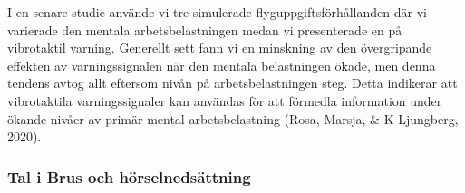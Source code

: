 \documentclass[]{article}
\begin{document}
I en senare studie använde vi tre simulerade flyguppgiftsförhållanden
där vi varierade den mentala arbetsbelastningen medan vi presenterade en
på vibrotaktil varning. Generellt sett fann vi en minskning av den
övergripande effekten av varningssignalen när den mentala belastningen
ökade, men denna tendens avtog allt eftersom nivån på arbetsbelastningen
steg. Detta indikerar att vibrotaktila varningssignaler kan användas för
att förmedla information under ökande nivåer av primär mental
arbetsbelastning (Rosa, Marsja, \& K-Ljungberg, 2020).

\hypertarget{tal-i-brus-och-huxf6rselnedsuxe4ttning}{%
\subsubsection{Tal i Brus och
hörselnedsättning}\label{tal-i-brus-och-huxf6rselnedsuxe4ttning}}
\end{document}
